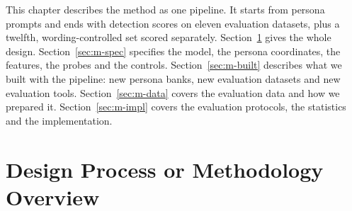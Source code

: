 
\label{ch:method}
This chapter describes the method as one pipeline. It starts from persona prompts and ends with detection scores on eleven evaluation datasets, plus a twelfth, wording-controlled set scored separately.
Section~\ref{sec:m-overview} gives the whole design. Section~\ref{sec:m-spec} specifies the model, the persona coordinates, the features, the probes and the controls. Section~\ref{sec:m-built} describes what we built with the pipeline: new persona banks, new evaluation datasets and new evaluation tools.
Section~\ref{sec:m-data} covers the evaluation data and how we prepared it. Section~\ref{sec:m-impl} covers the evaluation protocols, the statistics and the implementation.

\section{Design Process or Methodology Overview}
\label{sec:m-overview}

